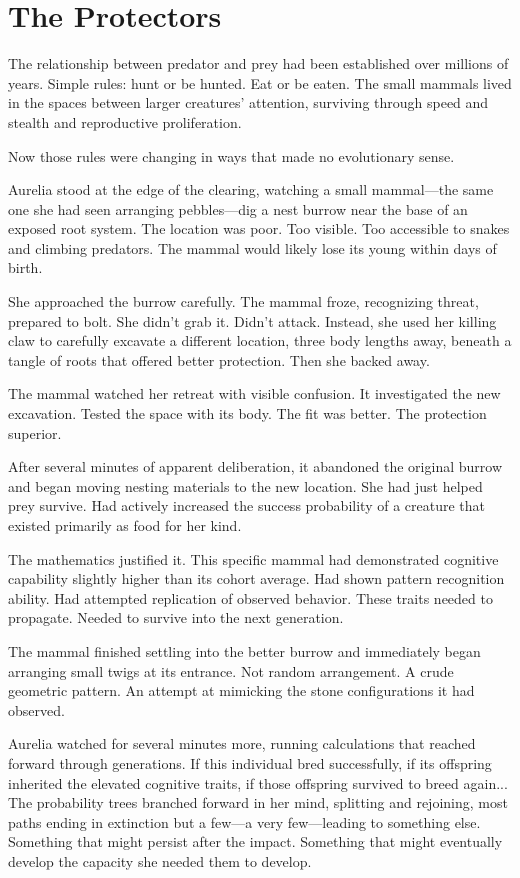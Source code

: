 \chapter{The Protectors}
\label{ch:06}


The relationship between predator and prey had been established over millions of years. Simple rules: hunt or be hunted. Eat or be eaten. The small mammals lived in the spaces between larger creatures' attention, surviving through speed and stealth and reproductive proliferation.

Now those rules were changing in ways that made no evolutionary sense.

Aurelia stood at the edge of the clearing, watching a small mammal—the same one she had seen arranging pebbles—dig a nest burrow near the base of an exposed root system. The location was poor. Too visible. Too accessible to snakes and climbing predators. The mammal would likely lose its young within days of birth.

She approached the burrow carefully. The mammal froze, recognizing threat, prepared to bolt. She didn't grab it. Didn't attack. Instead, she used her killing claw to carefully excavate a different location, three body lengths away, beneath a tangle of roots that offered better protection. Then she backed away.

The mammal watched her retreat with visible confusion. It investigated the new excavation. Tested the space with its body. The fit was better. The protection superior.

After several minutes of apparent deliberation, it abandoned the original burrow and began moving nesting materials to the new location. She had just helped prey survive. Had actively increased the success probability of a creature that existed primarily as food for her kind.

The mathematics justified it. This specific mammal had demonstrated cognitive capability slightly higher than its cohort average. Had shown pattern recognition ability. Had attempted replication of observed behavior. These traits needed to propagate. Needed to survive into the next generation.

The mammal finished settling into the better burrow and immediately began arranging small twigs at its entrance. Not random arrangement. A crude geometric pattern. An attempt at mimicking the stone configurations it had observed.

Aurelia watched for several minutes more, running calculations that reached forward through generations. If this individual bred successfully, if its offspring inherited the elevated cognitive traits, if those offspring survived to breed again... The probability trees branched forward in her mind, splitting and rejoining, most paths ending in extinction but a few—a very few—leading to something else. Something that might persist after the impact. Something that might eventually develop the capacity she needed them to develop.

